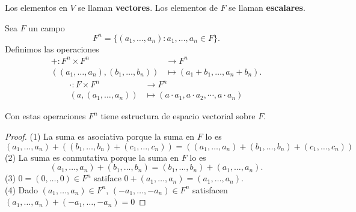 \documentclass[12pt,a4paper]{book}
\begin{document}
    \begin{definicion}
        Los elementos en $V$ se llaman \textbf{vectores}.
        Los elementos de $F$ se llaman \textbf{escalares}.
    \end{definicion}

    \begin{ejemplo}
        Sea $F$ un campo
        \begin{equation*}
            F^{n}=\{(a_{1},\dots,a_{n}):a_{1},\dots,a_{n}\in F\}.
        \end{equation*}
        Definimos las operaciones
        \begin{align*}
            +:F^{n}\times F^{n}&\to F^{n}\\
            ((a_{1},\dots,a_{n}),(b_{1},\dots,b_{n}))&\mapsto (a_{1}+b_{1},\dots,a_{n}+b_{n}).
        \end{align*}
        \begin{align*}
            \cdot:F\times F^{n}&\to F^{n}\\
            (a,(a_{1},\dots,a_{n}))&\mapsto (a\cdot a_{1},a\cdot a_{2},\cdots,a\cdot a_{n})
        \end{align*}
    \end{ejemplo}

    \begin{proposicion}
        Con estas operaciones $F^{n}$ tiene estructura de espacio vectorial sobre $F$.
    \end{proposicion}

    \begin{proof}
        (1) La suma es asociativa porque la suma en $F$ lo es
        \begin{equation*}
            (a_{1},\dots,a_{n})+((b_{1},\dots,b_{n})+(c_{1},\dots,c_{n}))=((a_{1},\dots,a_{n})+(b_{1},\dots,b_{n})+(c_{1},\dots,c_{n}))
        \end{equation*}
        (2) La suma es conmutativa porque la suma en $F$ lo es
        \begin{equation*}
            (a_{1},\dots,a_{n})+(b_{1},\dots,b_{n})=(b_{1},\dots,b_{n})+(a_{1},\dots,a_{n}).
        \end{equation*}
        (3) $0=(0,\dots,0)\in F^{n}$ satiface $0+(a_{1},\dots,a_{n})=(a_{1},\dots,a_{n})$.\\
        (4) Dado $(a_{1},\dots,a_{n})\in F^{n}$, $(-a_{1},\dots,-a_{n})\in F^{n}$ satisfacen
        $(a_{1},\dots,a_{n})+(-a_{1},\dots,-a_{n})=0$
    \end{proof}
\end{document}
